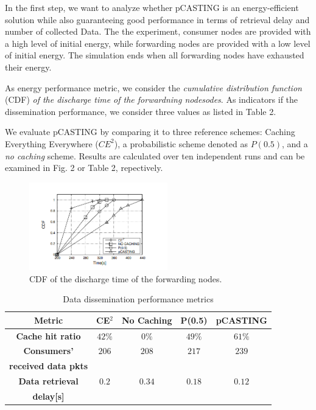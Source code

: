 \documentclass[conference]{IEEEtran}
\begin{document}
In the first step, we want to analyze whether pCASTING is an energy-efficient solution while also guaranteeing good performance in terms of 
retrieval delay and number of collected Data. The the experiment, consumer nodes are provided with a high level of initial energy, while forwarding nodes
are provided with a low level of initial energy. The simulation ends when all forwarding nodes have exhausted their energy.

As energy performance metric, we consider the \textit{cumulative distribution function} (CDF) \textit{of the discharge time of the forwardning nodesodes}.
As indicators if the dissemination performance, we consider three values as listed in Table 2.

We evaluate pCASTING by comparing it to three reference schemes:
Caching Everything Everywhere ($CE^2$),
a probabilistic scheme denoted as $P(0.5)$,
and a \textit{no caching} scheme.
Results are calculated over ten independent runs and can be examined in Fig. 2 or Table 2, repectively.

\begin{figure}[htbp]
    \centerline{\includegraphics[width=6cm]{fig2.png}}
    \caption{CDF of the discharge time of the forwarding nodes.}
    \label{fig2}
\end{figure}

\begin{table}[htbp]
    \caption{Data dissemination performance metrics}
    \begin{center}
    \begin{tabular}{c|c|c|c|c|}
    \textbf{Metric} & \textbf{CE$^\text{2}$}& \textbf{No Caching} & \textbf{P(0.5)} & \textbf{pCASTING} \\
    \hline
    \textbf{Cache hit ratio} & $42 \%$ & $0 \%$ & $49 \%$ & $61 \%$ \\
    \hline
    \textbf{Consumers'} & $206$ & $208$ & $217$ & $239$ \\
    \textbf{received data pkts} & & & & \\
    \hline
    \textbf{Data retrieval} & $0.2$ & $0.34$ & $0.18$ & $0.12$ \\
    \textbf{delay[s]} & & & & \\
    \hline
    \end{tabular}
    \label{tab2}
    \end{center}
\end{table}
\end{document}
